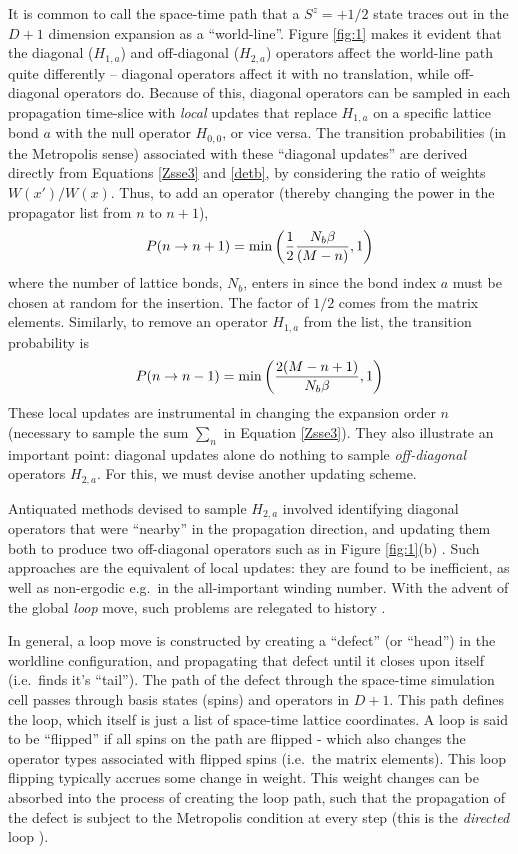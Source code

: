 \documentclass[vecphys]{svmult}
\begin{document}
It is common to call the space-time path that a $S^z=+1/2$ state traces out in the $D+1$ dimension expansion as a ``world-line''.  Figure \ref{fig:1} makes it evident that the diagonal ($H_{1,a}$) and off-diagonal ($H_{2,a}$) operators affect the world-line path quite differently -- diagonal operators affect it with no translation, while off-diagonal operators do.  Because of this, diagonal operators can be sampled in each propagation time-slice with {\em local} updates that replace $H_{1,a}$ on a specific lattice bond $a$ with the null operator $H_{0,0}$, or vice versa.  The transition probabilities (in the Metropolis sense) associated with these ``diagonal updates'' are derived directly from Equations \ref{Zsse3} and \ref{detb}, by considering the ratio of weights $W(x')/W(x)$. Thus,
to add an operator (thereby changing the power in the propagator list from $n$ to $n+1$),
\begin{eqnarray}
P(n \rightarrow n+1) = {\rm min} \left({ \frac{1}{2}\frac{N_b \beta}{(M-n)}, 1 }\right)
\end{eqnarray}
where the number of lattice bonds, $N_b$, enters in since the bond index $a$ must be chosen at random for the insertion.  The factor of $1/2$ comes from the matrix elements.  Similarly, to remove an operator $H_{1,a}$ from the list, the transition probability is
\begin{eqnarray}
P(n \rightarrow n-1) = {\rm min} \left({ \frac{2(M-n+1)}{N_b \beta}, 1 }\right)
\end{eqnarray}
These local updates are instrumental in changing the expansion order $n$ (necessary to sample the sum $\sum_n$ in Equation \ref{Zsse3}).  They also illustrate an important point: diagonal updates alone do nothing to sample {\em off-diagonal} operators $H_{2,a}$.  For this, we must devise another updating scheme.

Antiquated methods devised to sample $H_{2,a}$ involved identifying diagonal operators that were ``nearby'' in the propagation direction, and updating them both to produce two off-diagonal operators such as in Figure \ref{fig:1}(b) \cite{Melko:SandvikHeis}.  Such approaches are the equivalent of local updates: they are found to be inefficient, as well as non-ergodic e.g.~in the all-important winding number.  With the advent of the global {\it loop} move, such problems are relegated to history \cite{Melko:Sandvik99,Melko:Syljuasen02}.  

In general, a loop move is constructed by creating a ``defect'' (or ``head'') in the worldline configuration, and propagating that defect until it closes upon itself (i.e.~finds it's ``tail'').  The path of the defect through the space-time simulation cell passes through basis states (spins) and operators in $D+1$.  This path defines the loop, which itself is just a list of space-time lattice coordinates.  A loop is said to be ``flipped'' if all spins on the path are flipped - which also changes the operator types associated with flipped spins (i.e.~the matrix elements).
This loop flipping typically accrues some change in weight.  This weight changes can be absorbed into the process of creating the loop path, such that the propagation of the defect is subject to the Metropolis condition at every step (this is the {\em directed} loop \cite{Melko:Syljuasen02}).  
\end{document}
